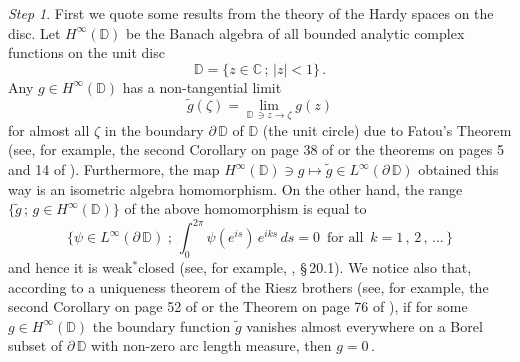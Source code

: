 \documentclass[reqno]{amsart}
\theoremstyle{definition}
\theoremstyle{remark}
\numberwithin{equation}{section}
\theoremstyle{plain}
\begin{document}
{\it Step 1}. First we quote some results from the theory of the
Hardy spaces on the disc. Let $H^\infty (\mathbb D )$ be the Banach
algebra of all bounded analytic complex functions on the unit disc
\begin{equation*}
{\mathbb D} =\{ z\in \mathbb C\, ;\, |z|<1\}\, .
\end{equation*}
Any $g\in H^\infty (\mathbb D )$ has a non-tangential limit
\begin{equation*}
\widetilde g (\zeta ) =\lim_{\mathbb D\,\ni z\to\zeta} g(z)
\end{equation*}
for almost all $\zeta$ in the boundary $\partial\,\mathbb D$ of
$\mathbb D$ (the unit circle) due to Fatou's Theorem (see, for
example, the second Corollary on page 38 of \cite{Ho} or the theorems
on pages 5 and 14 of \cite{Ko}). Furthermore, the map $H^\infty
(\mathbb D )\ni g\longmapsto\widetilde g\in L^\infty
(\partial\,\mathbb D)$ obtained this way is an isometric algebra
homomorphism. On the other hand, the range $\{\widetilde g\, ;\,
g\in H^\infty (\mathbb D )\}$ of the above homomorphism is equal to
\begin{equation*}
\{ \psi\in L^\infty (\partial\,\mathbb D)\; ;\, \int_0^{2\pi}
\psi (e^{is})\, e^{iks}\, ds =0\,\text{ for all }\, k=1\, ,\, 2
\, ,\,\ldots\,\}
\end{equation*}
and hence it is weak${}^*$closed (see, for example, \cite{Con},
\S$\,$20.1). We notice also that, according to a uniqueness theorem
of the Riesz brothers (see, for example, the second Corollary on
page 52 of \cite{Ho} or the Theorem on page 76 of \cite{Ko}),
if for some $g\in H^\infty (\mathbb D )$ the boundary function
$\widetilde g$ vanishes almost everywhere on a Borel subset of
$\partial\,\mathbb D$ with non-zero arc length measure, then
$g=0\,$.
\end{document}

